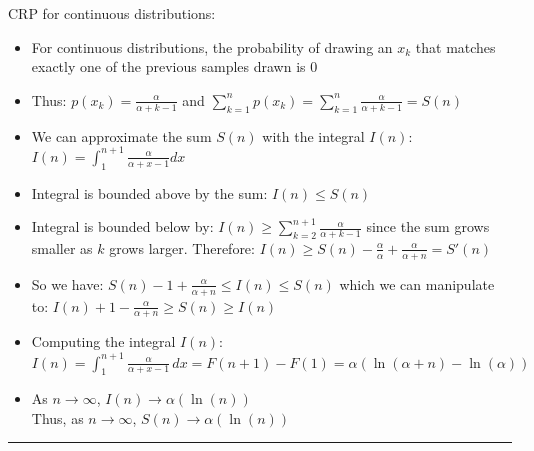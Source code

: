 CRP for continuous distributions:
\begin{itemize}
    \item For continuous distributions, the probability of drawing an $x_k$ that matches exactly one of the previous samples drawn is 0
    \item Thus: $p(x_k) = \frac{\alpha}{\alpha + k - 1}$ and $\sum_{k=1}^n p(x_k) = \sum_{k=1}^n \frac{\alpha}{\alpha + k - 1} = S(n)$
    \item We can approximate the sum $S(n)$ with the integral $I(n)$:
    $
    I(n) = \int_1^{n+1} \frac{\alpha}{\alpha + x - 1} dx
    $
    \item Integral is bounded above by the sum:
    $
    I(n) \leq S(n)
    $
    \item Integral is bounded below by:
    $
    I(n) \geq \sum_{k=2}^{n+1} \frac{\alpha}{\alpha + k - 1}
    $
    since the sum grows smaller as $k$ grows larger. Therefore:
    $
    I(n) \geq S(n) - \frac{\alpha}{\alpha} + \frac{\alpha}{\alpha + n} = S'(n)
    $
    \item So we have:
    $
    S(n) - 1 + \frac{\alpha}{\alpha + n} \leq I(n) \leq S(n)
    $
    which we can manipulate to:
    $
    I(n) + 1 - \frac{\alpha}{\alpha + n} \geq S(n) \geq I(n)
    $
    \item Computing the integral $I(n)$:
    $
    I(n) = \int_1^{n+1} \frac{\alpha}{\alpha + x - 1} \, dx = F(n+1) - F(1) = \alpha (\ln(\alpha + n) - \ln(\alpha))
    $
    \item As $n \to \infty$, $I(n) \to \alpha (\ln(n))$\\
    Thus, as $n \to \infty$, $S(n) \to \alpha (\ln(n))$
\end{itemize}

{\color{black}\hrule height 0.001mm}

